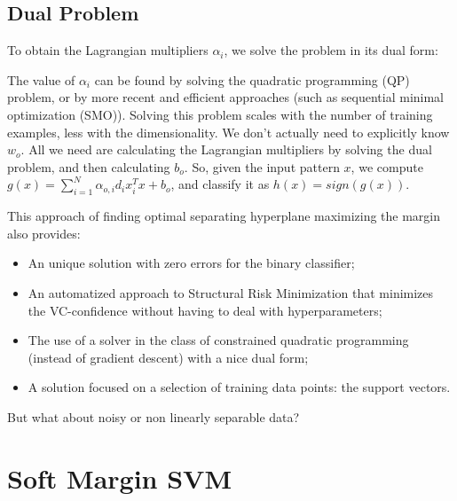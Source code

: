 \subsection{Dual Problem}

To obtain the Lagrangian multipliers $\alpha_i$, we solve the problem in its dual form:

The value of $\alpha_i$ can be found by solving the quadratic programming (QP) problem, or by more recent and efficient approaches (such as sequential minimal optimization (SMO)). Solving this problem scales with the number of training examples, less with the dimensionality. We don't actually need to explicitly know $w_o$. All we need are calculating the Lagrangian multipliers by solving the dual problem, and then calculating $b_o$. So, given the input pattern $x$, we compute $g(x) = \sum_{i=1}^N \alpha_{o,i} d_i x_i^T x + b_o$, and classify it as $h(x) = sign(g(x))$.

This approach of finding optimal separating hyperplane maximizing the margin also provides:
\begin{itemize}
    \item An unique solution with zero errors for the binary classifier;
    \item An automatized approach to Structural Risk Minimization that minimizes the VC-confidence without having to deal with hyperparameters;
    \item The use of a solver in the class of constrained quadratic programming (instead of gradient descent) with a nice dual form;
    \item A solution focused on a selection of training data points: the support vectors.
\end{itemize}
But what about noisy or non linearly separable data?

\section{Soft Margin SVM}

